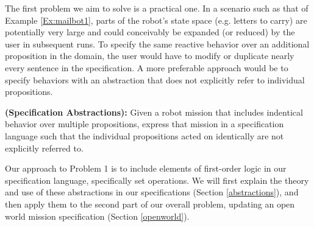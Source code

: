 The first problem we aim to solve is a practical one. In a scenario such as that of Example \ref{Ex:mailbot1}, parts of the robot's state space (e.g. letters to carry) are potentially very large and could conceivably be expanded (or reduced) by the user in subsequent runs. To specify the same reactive behavior over an additional proposition in the domain, the user would have to modify or duplicate nearly every sentence in the specification. A more preferable approach would be to specify behaviors with an abstraction that does not explicitly refer to individual propositions.

\begin{myProblem}\label{Prop:groups}
	\textbf{(Specification Abstractions):}
	Given a robot mission that includes indentical behavior over multiple propositions, express that mission in a specification language such that the individual propositions acted on identically are not explicitly referred to. 
\end{myProblem}

Our approach to Problem 1 is to include elements of first-order logic in our specification language, specifically set operations. We will first explain the theory and use of these abstractions in our specifications (Section \ref{abstractions}), and then apply them to the second part of our overall problem, updating an open world mission specification (Section \ref{openworld}). 

